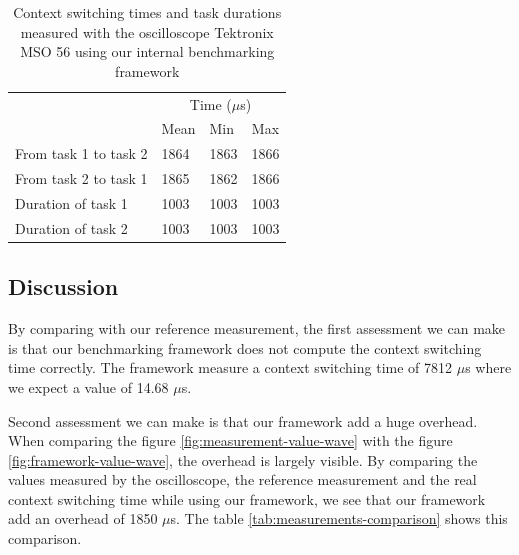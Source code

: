 \begin{table}[!ht]
  \centering
  \begin{tabular}{llll}
                        & \multicolumn{3}{c}{Time ($\mu$s)}                             \\ \cline{2-4} 
                        & \multicolumn{1}{c}{Mean} & Min  & \multicolumn{1}{c}{Max} \\ \cline{2-4} 
  From task 1 to task 2 & 1864                     & 1863 & 1866                    \\
  From task 2 to task 1 & 1865                     & 1862 & 1866                    \\
  Duration of task 1    & 1003                     & 1003 & 1003                    \\
  Duration of task 2    & 1003                     & 1003 & 1003                   
  \end{tabular}
  \caption{Context switching times and task durations measured with the oscilloscope Tektronix MSO 56 using our internal benchmarking framework}
  \label{tab:oscilloscope-framework-measurement}
\end{table}

\subsection{Discussion}

By comparing with our reference measurement, the first assessment we can make is that our benchmarking framework does not compute the context switching time correctly.
The framework measure a context switching time of 7812 $\mu$s where we expect a value of 14.68 $\mu$s.

Second assessment we can make is that our framework add a huge overhead.
When comparing the figure \ref{fig:measurement-value-wave} with the figure \ref{fig:framework-value-wave}, the overhead is largely visible.
By comparing the values measured by the oscilloscope, the reference measurement and the real context switching time while using our framework, we see that our framework add an overhead of 1850 $\mu$s.
The table \ref{tab:measurements-comparison} shows this comparison.

